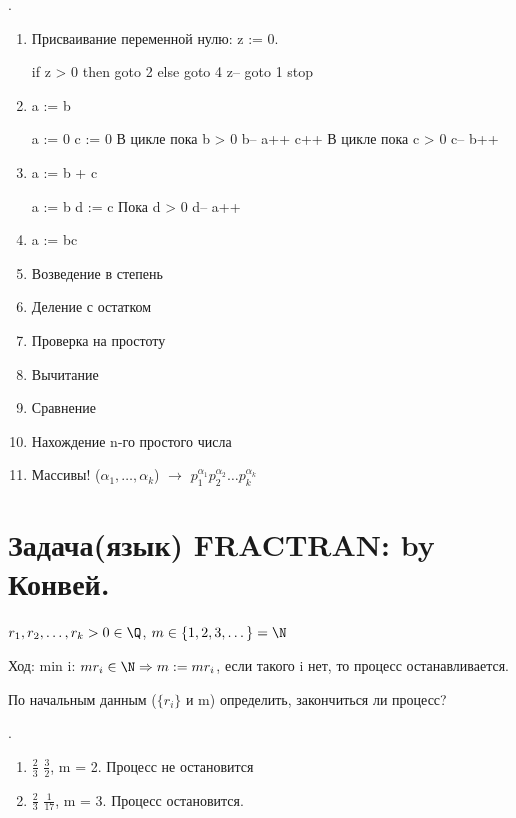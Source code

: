 \begin{exmp} .\\
	\begin{enumerate}
		\item Присваивание переменной нулю: z := 0.
		\begin{listing}[1]{1}
if z > 0 then goto 2 else goto 4
z--
goto 1
stop    \end{listing}
		\item a := b
		\begin{listing}[1]{1}
a := 0
c := 0
В цикле пока b > 0
	b--
	a++
	c++
В цикле пока c > 0
	c--
	b++ \end{listing}
	\item a := b + c
	\begin{listing}[1]{1}
a := b
d := c
Пока d > 0
	d--
	a++ 
	\end{listing}
	\item a := bc
	\item Возведение в степень
	\item Деление с остатком
	\item Проверка на простоту
	\item Вычитание
	\item Сравнение
	\item Нахождение n-го простого числа
	\item Массивы! ($\alpha_1, \dots, \alpha_k$) $\rightarrow$ $p_1^{\alpha_1}p_2^{\alpha_2}\dots p_k^{\alpha_k}$
	\end{enumerate}
\end{exmp} 


\section{Задача(язык) FRACTRAN: by Конвей.} 

$r_1, r_2, \dots, r_k > 0 \in \Q$, $m \in \{1, 2, 3, \dots\} = \N$

Ход: min i: $m{r_i} \in \N \Rightarrow m := mr_i$, если такого i нет, то процесс останавливается.

По начальным данным ($\{r_i\}$ и m) определить, закончиться ли процесс?

\begin{exmp} .\\ 
	\begin{enumerate}
		\item $\frac{2}{3}$ $\frac{3}{2}$, m = 2. Процесс не остановится
		\item $\frac{2}{3}$ $\frac{1}{17}$, m = 3. Процесс остановится.
	\end{enumerate}
\end{exmp}

